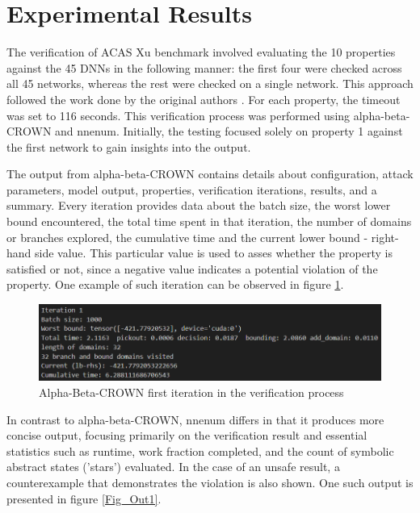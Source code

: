 \section{Experimental Results}
\label{chap:ch4}

The verification of ACAS Xu benchmark involved evaluating the 10 properties against the 45 DNNs in the following manner: the first four were checked across all 45 networks, whereas the rest were checked on a single network. This approach followed the work done by the original authors \cite{10.1007/978-3-030-25540-4_26}. For each property, the timeout was set to 116 seconds. This verification process was performed using alpha-beta-CROWN and nnenum. Initially, the testing focused solely on property 1 against the first network to gain insights into the output. 

The output from alpha-beta-CROWN contains details about configuration, attack parameters, model output, properties, verification iterations, results, and a summary. Every iteration provides data about the batch size, the worst lower bound encountered, the total time spent in that iteration, the number of domains or branches explored, the cumulative time and the current lower bound - right-hand side value. This particular value is used to asses whether the property is satisfied or not, since a negative value indicates a potential violation of the property. One example of such iteration can be observed in figure \ref{Fig_It1}.

\begin{figure}[htbp]
	\centering
		\includegraphics[width=14cm]{./Figures/it1.png}
	\caption{Alpha-Beta-CROWN first iteration in the verification process}
	\label{Fig_It1}
\end{figure}

In contrast to alpha-beta-CROWN, nnenum differs in that it produces more concise output, focusing primarily on the verification result and essential statistics such as runtime, work fraction completed, and the count of symbolic abstract states ('stars') evaluated. In the case of an unsafe result, a counterexample that demonstrates the violation is also shown. One such output is presented in figure \ref{Fig_Out1}.

